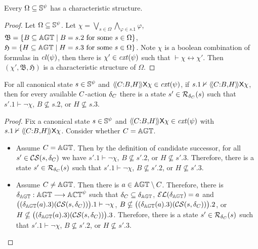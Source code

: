 \begin{theorem}
    Every $\Omega \subseteq \mathbb{S}^\psi$ has a characteristic structure.
\end{theorem}
\begin{proof} 
  Let $\Omega \subseteq \mathbb{S}^\psi$. 
  Let $\chi = \bigvee_{s\in \Omega}\bigwedge_{\varphi\in s.1}\varphi$, $\mathfrak{B} = \{B\subseteq \mathbb{AGT}\mid B=s.2 \text{ for some }s\in \Omega\}$, $\mathfrak{H} = \{H\subseteq \mathbb{AGT}\mid H=s.3 \text{ for some }s\in \Omega\}$. Note $\chi $ is a boolean combination of formulas in $\mathit{cl}(\psi)$, then there is $\chi' \in \mathit{cxt}(\psi)$ such that $\vdash \chi \leftrightarrow \chi'$. Then $(\chi',\mathfrak{B},\mathfrak{H})$ is a characteristic structure of $\Omega$.
\end{proof}

\begin{lemma}
For all canonical state $s\in \mathbb{S}^\psi$ and $\langle\!\langle C{:}B{,}H  \rangle\!\rangle\mathsf{X} \chi\in \mathit{cxt}(\psi)$, if $s.1\nvdash \langle\!\langle C{:}B{,}H  \rangle\!\rangle\mathsf{X} \chi$, then for every available $C$-action $\delta_C$ there is a state $s'\in \mathcal{R}_{\delta_C}(s)$ such that $s'.1\vdash \neg \chi $, $B\nsubseteq s.2$, or $H\nsubseteq s.3$.
\end{lemma}
\begin{proof}
Fix a canonical state $s\in \mathbb{S}^\psi$ and $\langle\!\langle C{:}B{,}H  \rangle\!\rangle\mathsf{X} \chi\in \mathit{cxt}(\psi)$ with $s.1\nvdash \langle\!\langle C{:}B{,}H  \rangle\!\rangle\mathsf{X} \chi$.
Consider whether $C=\mathbb{AGT} $.
\begin{itemize}
  \item Assume $C=\mathbb{AGT} $. Then by the definition of candidate successor, for all $s'\in \mathcal{CS}(s,\delta_C)$ we have $s'.1\vdash \neg \chi $, $B\nsubseteq s'.2$, or $H\nsubseteq s'.3$. Therefore, there is a state $s'\in \mathcal{R}_{\delta_C}(s)$ such that $s'.1\vdash \neg \chi $, $B\nsubseteq s'.2$, or $H\nsubseteq s'.3$.
  \item Assume $C\neq \mathbb{AGT} $. Then there is $a\in \mathbb{AGT}\setminus C $. Therefore, there is $\delta_{\mathbb{AGT}}:\mathbb{AGT}\longrightarrow \mathbb{ACT}^\psi $ such that $\delta_C \subseteq \delta_{\mathbb{AGT}} $, $\mathcal {EL}(\delta_{\mathbb{AGT}})=a$ and $\big((\delta_{\mathbb{AGT}}(a).3)(\mathcal{CS}(s,\delta_C))\big).1\vdash \neg \chi $, $B\nsubseteq \big((\delta_{\mathbb{AGT}}(a).3)(\mathcal{CS}(s,\delta_C))\big).2$, or $H\nsubseteq \big((\delta_{\mathbb{AGT}}(a).3)(\mathcal{CS}(s,\delta_C))\big).3$.
    Therefore, there is a state $s'\in \mathcal{R}_{\delta_C}(s)$ such that $s'.1\vdash \neg \chi $, $B\nsubseteq s'.2$, or $H\nsubseteq s'.3$.
\end{itemize}
\end{proof}

